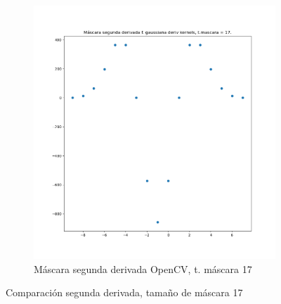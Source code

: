 \documentclass[12pt, spanish]{article}
\begin{document}
\begin{figure}[H]
\begin{subfigure}[t]{0.4\textwidth}
		\includegraphics[width = \textwidth]{cmp-2cv17.png}
 		 \caption{Máscara segunda derivada OpenCV, t. máscara 17}
	\end{subfigure}
	\caption{Comparación segunda derivada, tamaño de máscara 17}

  	\label{fig:ej1c5}
\end{figure}
\end{document}
